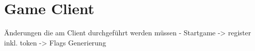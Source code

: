 \section{Game Client} \label{sec:Game_Client}

Änderungen die am Client durchgeführt werden müssen
- Startgame -> register inkl. token
-> Flags Generierung